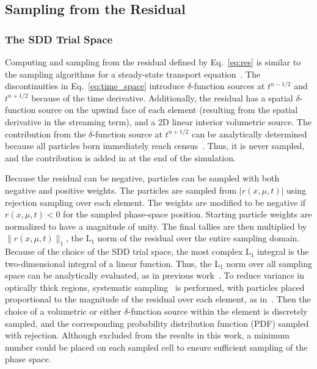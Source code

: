 \documentclass{anstrans}
\begin{document}
\subsection{Sampling from the Residual}

\subsubsection{The SDD Trial Space}

Computing and sampling from the residual defined by Eq.~\eqref{eq:res} is similar to the sampling algorithms
for a steady-state transport equation~\cite{jake,jake_thesis,bolding_nse}. 
The discontinuities in Eq.~\eqref{eq:time_space} introduce $\delta$-function sources at $t^{n-1/2}$ and $t^{n+1/2}$
because of the time derivative.  Additionally, the residual has a spatial $\delta$-function source
on the upwind face of each element (resulting from the spatial
derivative in the streaming term), and a 2D linear interior volumetric source.
The contribution from the $\delta$-function source at $t^{n+1/2}$ can be analytically
determined because all particles born immediately reach census~\cite{dissertation}.  Thus, it is never sampled, and the
contribution is added in at the end of the simulation.  

Because the residual can be negative, particles can be sampled with both negative and positive weights.  The
particles are sampled from $|r(x,\mu,t)|$ using rejection sampling over each element. The weights are
modified to be negative if $r(x,\mu,t)<0$ for the sampled phase-space position.
Starting particle weights are normalized to have a magnitude of unity.  The 
final tallies are then multiplied by $\|r(x,\mu,t)\|_1$, the L$_1$ norm of the residual over the entire
sampling domain.  Because of the choice of the SDD trial space, the most complex L$_1$ integral is
the two-dimensional integral of a linear function.  Thus, the L$_1$ norm over all sampling space can be analytically
evaluated, as in previous work~\cite{jake}. To reduce variance in optically
thick regions, systematic sampling~\cite{shultis_mc} is performed, with particles placed proportional to the magnitude
of the residual over each element, as in~\cite{bolding_nse}.  Then the choice of a volumetric or either
$\delta$-function source within the element is discretely sampled, and the corresponding probability
distribution function (PDF) sampled with rejection.  Although excluded from the results in this work, a minimum
number could be placed on each sampled cell to ensure sufficient sampling of the phase space.
\end{document}
